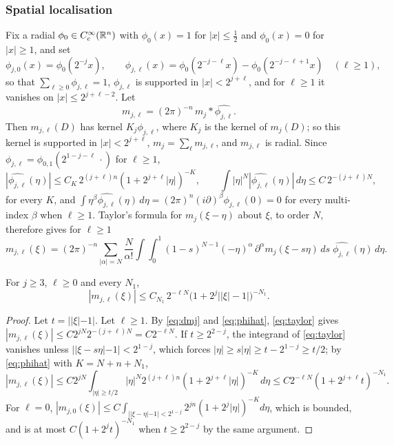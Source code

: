 \subsubsection*{Spatial localisation}
Fix a radial $\phi_0\in C^\infty_c(\mathbb{R}^n)$ with $\phi_0(x)=1$ for $|x|\le\frac12$ and $\phi_0(x)=0$ for
$|x|\ge1$, and set
\begin{equation}\label{eq:phijl}
\phi_{j,0}(x)=\phi_0(2^{-j}x),\qquad \phi_{j,\ell}(x)=\phi_0(2^{-j-\ell}x)-\phi_0(2^{-j-\ell+1}x)\quad(\ell\ge1),
\end{equation}
so that $\sum_{\ell\ge0}\phi_{j,\ell}=1$, $\phi_{j,\ell}$ is supported in $|x|<2^{j+\ell}$, and for $\ell\ge1$ it
vanishes on $|x|\le2^{j+\ell-2}$. Let
\begin{equation}\label{eq:mjl}
m_{j,\ell}=(2\pi)^{-n}\,m_j*\widehat{\phi_{j,\ell}} .
\end{equation}
Then $m_{j,\ell}(D)$ has kernel $K_j\phi_{j,\ell}$, where $K_j$ is the kernel of $m_j(D)$; so this kernel
is supported in $|x|<2^{j+\ell}$, $m_j=\sum_\ell m_{j,\ell}$, and $m_{j,\ell}$ is radial. Since
$\phi_{j,\ell}=\phi_{0,1}(2^{1-j-\ell}\,\cdot)$ for $\ell\ge1$,
\begin{equation}\label{eq:phihat}
|\widehat{\phi_{j,\ell}}(\eta)|\le C_K\,2^{(j+\ell)n}(1+2^{j+\ell}|\eta|)^{-K},\qquad
\int|\eta|^N|\widehat{\phi_{j,\ell}}(\eta)|\,d\eta\le C\,2^{-(j+\ell)N},
\end{equation}
for every $K$, and $\int\eta^\beta\widehat{\phi_{j,\ell}}(\eta)\,d\eta=(2\pi)^n(i\partial)^\beta\phi_{j,\ell}(0)=0$
for every multi-index $\beta$ when $\ell\ge1$. Taylor's formula for $m_j(\xi-\eta)$ about $\xi$, to
order $N$, therefore gives for $\ell\ge1$
\begin{equation}\label{eq:taylor}
m_{j,\ell}(\xi)=(2\pi)^{-n}\sum_{|\alpha|=N}\frac N{\alpha!}\int\!\!\int_0^1(1-s)^{N-1}(-\eta)^\alpha\,
\partial^\alpha m_j(\xi-s\eta)\,ds\;\widehat{\phi_{j,\ell}}(\eta)\,d\eta .
\end{equation}

\begin{lemma}\label{lem:mjlpoint}
For $j\ge3$, $\ell\ge0$ and every $N_1$,
\[
|m_{j,\ell}(\xi)|\le C_{N_1}\,2^{-\ell N}\bigl(1+2^j\bigl||\xi|-1\bigr|\bigr)^{-N_1}.
\]
\end{lemma}

\begin{proof}
Let $t=||\xi|-1|$. Let $\ell\ge1$. By \eqref{eq:dmj} and \eqref{eq:phihat}, \eqref{eq:taylor} gives
$|m_{j,\ell}(\xi)|\le C2^{jN}2^{-(j+\ell)N}=C2^{-\ell N}$. If $t\ge2^{2-j}$, the integrand of \eqref{eq:taylor}
vanishes unless $||\xi-s\eta|-1|<2^{1-j}$, which forces $|\eta|\ge s|\eta|\ge t-2^{1-j}\ge t/2$; by
\eqref{eq:phihat} with $K=N+n+N_1$,
\[
|m_{j,\ell}(\xi)|\le C2^{jN}\int_{|\eta|\ge t/2}|\eta|^N2^{(j+\ell)n}(1+2^{j+\ell}|\eta|)^{-K}\,d\eta
\le C2^{-\ell N}(1+2^{j+\ell}t)^{-N_1}.
\]
For $\ell=0$, $|m_{j,0}(\xi)|\le C\int_{||\xi-\eta|-1|<2^{1-j}}2^{jn}(1+2^j|\eta|)^{-K}d\eta$, which is bounded,
and is at most $C(1+2^jt)^{-N_1}$ when $t\ge2^{2-j}$ by the same argument.
\end{proof}

